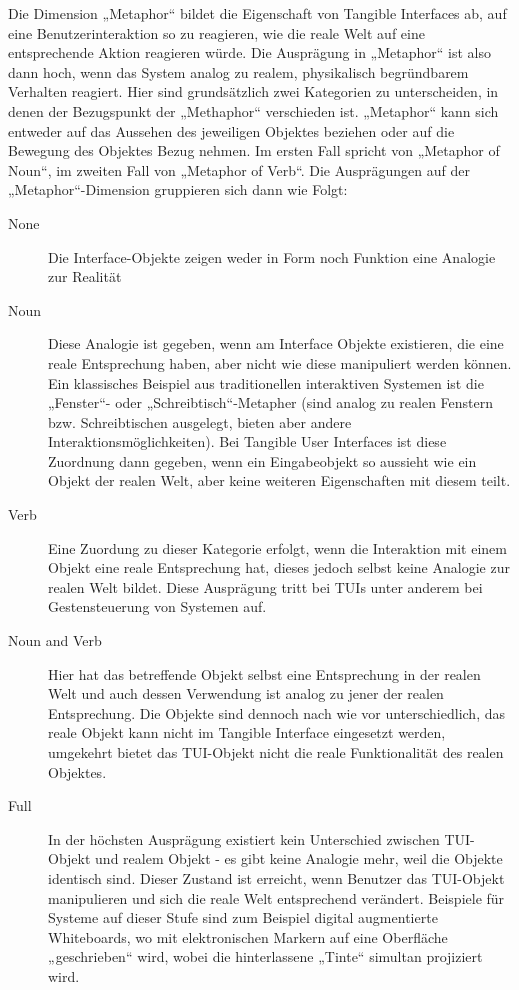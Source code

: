 Die Dimension „Metaphor“ bildet die Eigenschaft von Tangible Interfaces ab, auf eine Benutzerinteraktion so zu reagieren, wie die reale Welt auf eine entsprechende Aktion reagieren würde. Die Ausprägung in „Metaphor“ ist also dann hoch, wenn das System analog zu realem, physikalisch begründbarem Verhalten reagiert. Hier sind grundsätzlich zwei Kategorien zu unterscheiden, in denen der Bezugspunkt der „Methaphor“ verschieden ist. „Metaphor“ kann sich entweder auf das Aussehen des jeweiligen Objektes beziehen oder auf die Bewegung des Objektes Bezug nehmen. Im ersten Fall spricht \citeauthor{Fishkin04} von „Metaphor of Noun“, im zweiten Fall von „Metaphor of Verb“. Die Ausprägungen auf der „Metaphor“-Dimension gruppieren sich dann wie Folgt:
\begin{description}
 \item[None] Die Interface-Objekte zeigen weder in Form noch Funktion eine Analogie zur Realität
 \item[Noun] Diese Analogie ist gegeben, wenn am Interface Objekte existieren, die eine reale Entsprechung haben, aber nicht wie diese manipuliert werden können. Ein klassisches Beispiel aus traditionellen interaktiven Systemen ist die „Fenster“- oder „Schreibtisch“-Metapher (sind analog zu realen Fenstern bzw. Schreibtischen ausgelegt, bieten aber andere Interaktionsmöglichkeiten). Bei Tangible User Interfaces ist diese Zuordnung dann gegeben, wenn ein Eingabeobjekt so aussieht wie ein Objekt der realen Welt, aber keine weiteren Eigenschaften mit diesem teilt.
 \item[Verb] Eine Zuordung zu dieser Kategorie erfolgt, wenn die Interaktion mit einem Objekt eine reale Entsprechung hat, dieses jedoch selbst keine Analogie zur realen Welt bildet. Diese Ausprägung tritt bei \glspl{TUI} unter anderem bei Gestensteuerung von Systemen auf.
 \item[Noun and Verb] Hier hat das betreffende Objekt selbst eine Entsprechung in der realen Welt und auch dessen Verwendung ist analog zu jener der realen Entsprechung. Die Objekte sind dennoch nach wie vor unterschiedlich, das reale Objekt kann nicht im Tangible Interface eingesetzt werden, umgekehrt bietet das \gls{TUI}-Objekt nicht die reale Funktionalität des realen Objektes. 
 \item[Full] In der höchsten Ausprägung existiert kein Unterschied zwischen \gls{TUI}-Objekt und realem Objekt - es gibt keine Analogie mehr, weil die Objekte identisch sind. Dieser Zustand ist erreicht, wenn Benutzer das TUI-Objekt manipulieren und sich die reale Welt entsprechend verändert. Beispiele für Systeme auf dieser Stufe sind zum Beispiel digital augmentierte Whiteboards, wo mit elektronischen Markern auf eine Oberfläche „geschrieben“ wird, wobei die hinterlassene „Tinte“ simultan projiziert wird.
\end{description}

